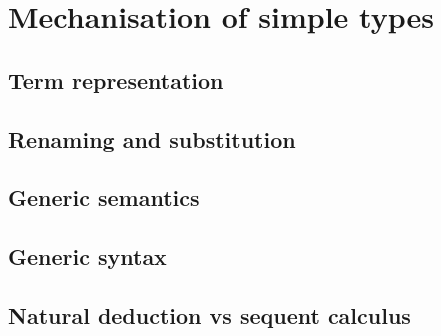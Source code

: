 \chapter{Mechanisation of simple types}\label{sec:simple}

\section{Term representation}

\section{Renaming and substitution}\label{sec:kits}

\section{Generic semantics}

\section{Generic syntax}
\section{Natural deduction vs sequent calculus}

